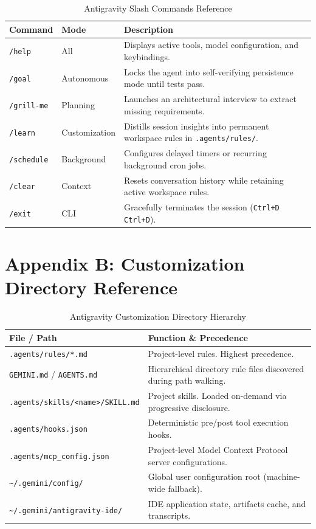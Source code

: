 \documentclass[11pt,a4paper,oneside]{book}
\begin{document}
\begin{table}[htbp]
\centering
\caption{Antigravity Slash Commands Reference}
\begin{tabularx}{\textwidth}{llX}
\toprule
\textbf{Command} & \textbf{Mode} & \textbf{Description} \\
\midrule
\texttt{/help} & All & Displays active tools, model configuration, and keybindings. \\
\texttt{/goal} & Autonomous & Locks the agent into self-verifying persistence mode until tests pass. \\
\texttt{/grill-me} & Planning & Launches an architectural interview to extract missing requirements. \\
\texttt{/learn} & Customization & Distills session insights into permanent workspace rules in \texttt{.agents/rules/}. \\
\texttt{/schedule} & Background & Configures delayed timers or recurring background cron jobs. \\
\texttt{/clear} & Context & Resets conversation history while retaining active workspace rules. \\
\texttt{/exit} & CLI & Gracefully terminates the session (\texttt{Ctrl+D Ctrl+D}). \\
\bottomrule
\end{tabularx}
\end{table}

\chapter{Appendix B: Customization Directory Reference}

\begin{table}[htbp]
\centering
\caption{Antigravity Customization Directory Hierarchy}
\begin{tabularx}{\textwidth}{lX}
\toprule
\textbf{File / Path} & \textbf{Function \& Precedence} \\
\midrule
\texttt{.agents/rules/*.md} & Project-level rules. Highest precedence. \\
\texttt{GEMINI.md} / \texttt{AGENTS.md} & Hierarchical directory rule files discovered during path walking. \\
\texttt{.agents/skills/<name>/SKILL.md} & Project skills. Loaded on-demand via progressive disclosure. \\
\texttt{.agents/hooks.json} & Deterministic pre/post tool execution hooks. \\
\texttt{.agents/mcp\_config.json} & Project-level Model Context Protocol server configurations. \\
\texttt{\textasciitilde/.gemini/config/} & Global user configuration root (machine-wide fallback). \\
\texttt{\textasciitilde/.gemini/antigravity-ide/} & IDE application state, artifacts cache, and transcripts. \\
\bottomrule
\end{tabularx}
\end{table}
\end{document}
